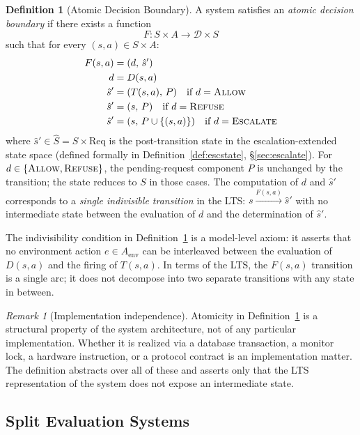 \documentclass[11pt]{article}
\theoremstyle{plain}
\theoremstyle{definition}
\newtheorem{definition}[theorem]{Definition}
\theoremstyle{remark}
\newtheorem{remark}[theorem]{Remark}
\newcommand{\Allow}{\textsc{Allow}}
\newcommand{\Refuse}{\textsc{Refuse}}
\newcommand{\Escalate}{\textsc{Escalate}}
\newcommand{\Dset}{\mathcal{D}}
\newcommand{\Req}{\mathrm{Req}}
\begin{document}
\begin{definition}[Atomic Decision Boundary]
\label{def:atomic}
A system satisfies an \emph{atomic decision boundary} if there exists a
function
\[
  F : S \times A \to \Dset \times S
\]
such that for every $(s, a) \in S \times A$:
\begin{align}
  F(s, a) &= (d,\, \hat{s}') \label{eq:atomic-pair}\\
  d &= D(s, a) \label{eq:atomic-decision}\\
  \hat{s}' &= (T(s, a),\, P) \quad \text{if } d = \Allow \label{eq:atomic-transition}\\
  \hat{s}' &= (s,\, P) \quad \text{if } d = \Refuse \label{eq:atomic-refuse}\\
  \hat{s}' &= (s,\, P \cup \{(s,a)\}) \quad \text{if } d = \Escalate
              \label{eq:atomic-escalate}
\end{align}
where $\hat{s}' \in \hat{S} = S \times \Req$ is the post-transition state
in the escalation-extended state space (defined formally in
Definition~\ref{def:escstate}, \S\ref{sec:escalate}).  For
$d \in \{\Allow, \Refuse\}$, the pending-request component $P$ is unchanged
by the transition; the state reduces to $S$ in those cases.
The computation of $d$ and $\hat{s}'$ corresponds to a \emph{single indivisible
transition} in the LTS: $s \xrightarrow{F(s,a)} \hat{s}'$ with no intermediate
state between the evaluation of $d$ and the determination of $\hat{s}'$.
\end{definition}

The indivisibility condition in Definition~\ref{def:atomic} is a model-level
axiom: it asserts that no environment action $e \in A_{\mathrm{env}}$ can be
interleaved between the evaluation of $D(s, a)$ and the firing of $T(s, a)$.
In terms of the LTS, the $F(s,a)$ transition is a single arc; it does not
decompose into two separate transitions with any state in between.

\begin{remark}[Implementation independence]
\label{rem:impl}
Atomicity in Definition~\ref{def:atomic} is a structural property of the
system architecture, not of any particular implementation.  Whether it is
realized via a database transaction, a monitor lock, a hardware instruction, or
a protocol contract is an implementation matter.  The definition abstracts over
all of these and asserts only that the LTS representation of the system does
not expose an intermediate state.
\end{remark}

\subsection{Split Evaluation Systems}
\label{sec:split}
\end{document}
